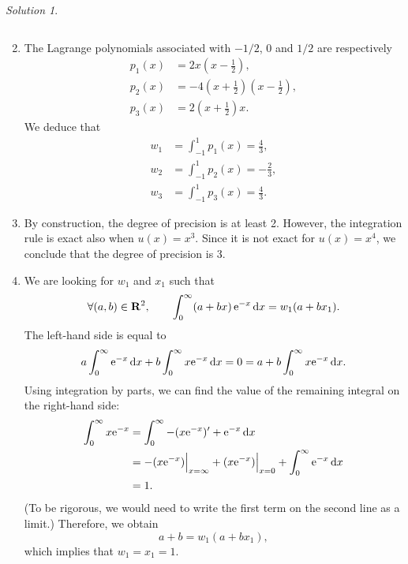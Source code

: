 \documentclass[11pt]{article}
\theoremstyle{definition}
\theoremstyle{remark}
\newtheorem*{solution}{Solution}
\begin{document}
\begin{solution}
    \begin{enumerate}
        $~$
        \item
            The Lagrange polynomials associated with $-1/2$, $0$ and $1/2$ are respectively
            \begin{align*}
                p_{1}(x) &= 2x \left(x - \frac{1}{2}\right), \\
                p_{2}(x)    &= - 4\left(x + \frac{1}{2}\right) \left(x - \frac{1}{2}\right), \\
                p_{3}(x)  &= 2\left(x + \frac{1}{2}\right) x.
            \end{align*}
            We deduce that
            \begin{align*}
                w_1 &= \int_{-1}^1 p_{1}(x) = \frac{4}{3}, \\
                w_2 &= \int_{-1}^1 p_{2}(x) = - \frac{2}{3}, \\
                w_3 &= \int_{-1}^1 p_{3}(x) = \frac{4}{3}.
            \end{align*}

        \item
            By construction,
            the degree of precision is at least 2.
            However, the integration rule is exact also when $u(x) = x^3$.
            Since it is not exact for $u(x) = x^4$,
            we conclude that the degree of precision is 3.

        \item
            We are looking for $w_1$ and $x_1$ such that
            \[
                \forall (a,b) \in \mathbf R^2, \qquad
                \int_{0}^{\infty} (a + bx) \, \mathrm e^{-x} \, \mathrm d x = w_1 (a + b x_1).
            \]
            The left-hand side is equal to
            \[
                a \int_{0}^{\infty} \mathrm e^{-x} \, \mathrm d x + b \int_{0}^{\infty} x \mathrm e^{-x} \, \mathrm d x = 0
                = a + b \int_{0}^{\infty} x \mathrm e^{-x} \, \mathrm d x.
            \]
            Using integration by parts,
            we can find the value of the remaining integral on the right-hand side:
            \begin{align*}
                \int_{0}^{\infty} x \mathrm e^{-x}
                &= \int_{0}^{\infty} - (x \mathrm e^{-x})' + \mathrm e^{-x} \, \mathrm d x \\
                &= - (x \mathrm e^{-x}) \Big\vert_{x={\infty}} + (x \mathrm e^{-x}) \Big\vert_{x={0}} + \int_{0}^{\infty} \mathrm e^{-x} \, \mathrm d x \\
                &= 1.
            \end{align*}
            (To be rigorous, we would need to write the first term on the second line as a limit.)
            Therefore, we obtain
            \[
                a + b = w_1(a + b x_1),
            \]
            which implies that $w_1 = x_1 = 1$.


\end{enumerate}
\end{solution}
\end{document}
